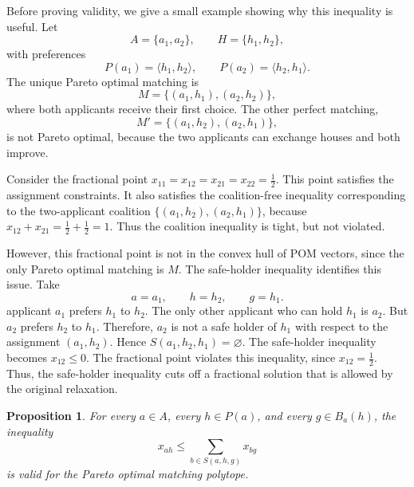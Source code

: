 \documentclass[12pt]{report}
\newtheorem{pprop}[base]{Proposition}
\numberwithin{algorithm}{chapter}
\begin{document}
	Before proving validity, we give a small example showing why this inequality is useful. Let
	\[
	A=\{a_1,a_2\},
	\qquad
	H=\{h_1,h_2\},
	\]
	with preferences
	\[
	P(a_1)=\langle h_1,h_2\rangle,
	\qquad
	P(a_2)=\langle h_2,h_1\rangle.
	\]
	The unique Pareto optimal matching is
	\[
	M=\{(a_1,h_1),(a_2,h_2)\},
	\]
	where both applicants receive their first choice. The other perfect matching,
	\[
	M'=\{(a_1,h_2),(a_2,h_1)\},
	\]
	is not Pareto optimal, because the two applicants can exchange houses and both improve.
	
	Consider the fractional point
	$x_{11}=x_{12}=x_{21}=x_{22}=\frac{1}{2}.$
	This point satisfies the assignment constraints. It also satisfies the coalition-free inequality corresponding to the two-applicant coalition $\{(a_1,h_2),(a_2,h_1)\}$, because
	$x_{12}+x_{21}=\frac{1}{2}+\frac{1}{2}=1.$
	Thus the coalition inequality is tight, but not violated.
	
	However, this fractional point is not in the convex hull of POM vectors, since the only Pareto optimal matching is $M$. The safe-holder inequality identifies this issue. Take
	\[
	a=a_1,
	\qquad
	h=h_2,
	\qquad
	g=h_1.
	\]
	applicant $a_1$ prefers $h_1$ to $h_2$. The only other applicant who can hold $h_1$ is $a_2$. But $a_2$ prefers $h_2$ to $h_1$. Therefore, $a_2$ is not a safe holder of $h_1$ with respect to the assignment $(a_1,h_2)$. Hence
	$S(a_1,h_2,h_1)=\varnothing.$
	The safe-holder inequality becomes
	$x_{12}\le 0.$
	The fractional point violates this inequality, since
	$x_{12}=\frac{1}{2}.$
	Thus, the safe-holder inequality cuts off a fractional solution that is allowed by the original relaxation.
	
	\begin{pprop}
		For every $a\in A$, every $h\in P(a)$, and every $g\in B_a(h)$, the inequality
		\[
		x_{ah}
		\le
		\sum_{b\in S(a,h,g)}x_{bg}
		\]
		is valid for the Pareto optimal matching polytope.
	\end{pprop}
	
\end{document}
